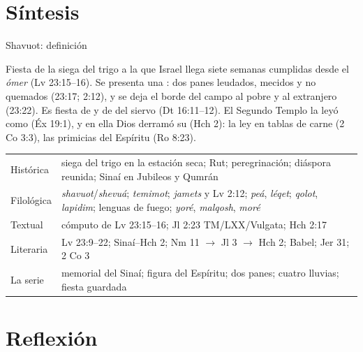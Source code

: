 \section{Síntesis}

\begin{frame}{Shavuot: definición}
\begin{tcolorbox}[colback=papiro,colframe=tierraroja,boxrule=1pt,arc=3pt]
\small\RaggedRight Fiesta de la siega del trigo a la que Israel llega  siete semanas cumplidas desde el \emph{ómer} (Lv 23:15--16). Se presenta una : dos panes leudados, mecidos y no quemados (23:17; 2:12), y se deja el borde del campo al pobre y al extranjero (23:22). Es fiesta de  y de  del siervo (Dt 16:11--12). El Segundo Templo la leyó como  (Éx 19:1), y en ella Dios derramó su  (Hch 2): la ley en tablas de carne (2 Co 3:3), las primicias del Espíritu (Ro 8:23).
\end{tcolorbox}
\scriptsize\renewcommand{\arraystretch}{1.08}
\begin{tabular}{@{}L{1.8cm}L{10.1cm}@{}}
\toprule
Histórica & siega del trigo en la estación seca; Rut; peregrinación; diáspora reunida; Sinaí en Jubileos y Qumrán \\
Filológica & \emph{shavuot}/\emph{shevuá}; \emph{temimot}; \emph{jamets} y Lv 2:12; \emph{peá}, \emph{léqet}; \emph{qolot}, \emph{lapidim}; lenguas de fuego; \emph{yoré}, \emph{malqosh}, \emph{moré} \\
Textual & cómputo de Lv 23:15--16; Jl 2:23 TM/LXX/Vulgata; Hch 2:17 \\
Literaria & Lv 23:9--22; Sinaí--Hch 2; Nm 11 $\rightarrow$ Jl 3 $\rightarrow$ Hch 2; Babel; Jer 31; 2 Co 3 \\
La serie & memorial del Sinaí; figura del Espíritu; dos panes; cuatro lluvias; fiesta guardada \\
\bottomrule
\end{tabular}
\end{frame}

\section{Reflexión}


